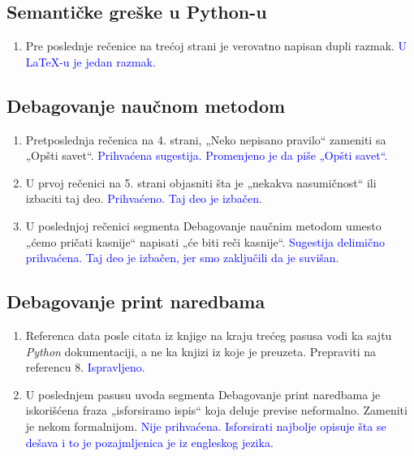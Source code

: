 \documentclass[a4paper]{report}
\newcommand{\odgovor}[1]{\textcolor{blue}{#1}}
\begin{document}
\subsection{Semantičke greške u Python-u}
\begin{enumerate}
    \item Pre poslednje rečenice na trećoj strani je verovatno napisan dupli razmak.
    \odgovor{U LaTeX-u je jedan razmak.}
\end{enumerate}
\subsection{Debagovanje naučnom metodom}
\begin{enumerate}
    \item Pretposlednja rečenica na 4. strani, „Neko nepisano pravilo“ zameniti sa „Opšti savet“.
    \odgovor{Prihvaćena sugestija. Promenjeno je da piše „Opšti savet“.}
    \item U prvoj rečenici na 5. strani objasniti šta je „nekakva nasumičnost“ ili izbaciti taj deo.
    \odgovor{Prihvaćeno. Taj deo je izbačen.}
    \item U poslednjoj rečenici segmenta Debagovanje naučnim metodom umesto „ćemo pričati kasnije“ napisati „će biti reči kasnije“.
    \odgovor{Sugestija delimično prihvaćena. Taj deo je izbačen, jer smo zaključili da je suvišan.}
\end{enumerate}
\subsection{Debagovanje print naredbama}
\begin{enumerate}
    \item Referenca data posle citata iz knjige na kraju trećeg pasusa vodi ka sajtu \emph{Python} dokumentaciji, a ne ka knjizi iz koje je preuzeta. Prepraviti na referencu 8.
    \odgovor{Ispravljeno.}
    \item U poslednjem pasusu uvoda segmenta Debagovanje print naredbama je iskorišćena fraza „isforsiramo ispis“ koja deluje previse neformalno. Zameniti je nekom formalnijom.
    \odgovor{Nije prihvaćena. Isforsirati najbolje opisuje šta se dešava i to je pozajmljenica je iz engleskog jezika.}
\end{enumerate}
\end{document}
